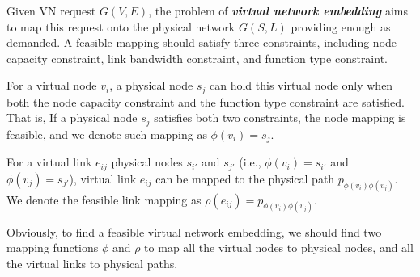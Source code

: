 Given  VN request $G (V,E)$, the problem of \textbf{\emph{virtual network embedding}} aims to map this request onto the physical network $G (S,L)$  providing enough  as demanded. A feasible mapping should satisfy three constraints, including node capacity constraint, link bandwidth constraint, and function type constraint.

For a virtual node $v_i$, a physical node $s_j$ can hold this virtual node only when both the node capacity constraint  and  the function type constraint  are satisfied. That is,  If a physical node $s_j$ satisfies both two  constraints, the node mapping is feasible, and we denote such mapping as $\phi ({v_i}) = {s_j}$.


For a virtual link $e_{ij}$  physical nodes $s_{i'}$ and $s_{j'}$ (i.e., $\phi({v_i}) = {s_{i'}}$ and $\phi({v_j}) = {s_{j'}}$),  virtual link  $e_{ij}$ can be mapped to the physical path $p_{\phi({v_i}) \phi({v_j})}$. We denote the feasible link mapping as $\rho(e_{ij}) = p_{\phi({v_i}) \phi({v_j})}$.

Obviously, to find a feasible virtual network embedding, we should find two mapping functions $\phi$ and $\rho$ to map all the virtual nodes to physical nodes, and all the virtual links to physical paths.


